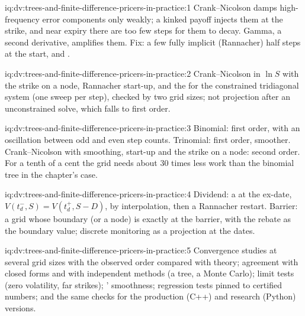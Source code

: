 \begin{solution}{iq:dv:trees-and-finite-difference-pricers-in-practice:1}
Crank--Nicolson damps high-frequency error components only weakly; a kinked payoff injects them at the strike, and near expiry there are too few
steps for them to decay. Gamma, a second derivative, amplifies them. Fix: a few fully implicit (Rannacher) half steps at the start, and .
\end{solution}

\begin{solution}{iq:dv:trees-and-finite-difference-pricers-in-practice:2}
Crank--Nicolson in $\ln S$ with the strike on a node, Rannacher start-up, and the  for the constrained tridiagonal system (one
sweep per step), checked by two grid sizes; not projection after an unconstrained solve, which falls to first order.
\end{solution}

\begin{solution}{iq:dv:trees-and-finite-difference-pricers-in-practice:3}
Binomial: first order, with an oscillation between odd and even step counts. Trinomial: first order, smoother. Crank--Nicolson with smoothing, start-up and
the strike on a node: second order. For a tenth of a cent the grid needs about 30 times less work than the binomial tree in the chapter's case.
\end{solution}

\begin{solution}{iq:dv:trees-and-finite-difference-pricers-in-practice:4}
Dividend: a  at the ex-date, $V(t_d^-,S)=V(t_d^+,S-D)$, by interpolation, then a Rannacher restart. Barrier: a grid whose boundary (or a node) is
exactly at the barrier, with the rebate as the boundary value; discrete monitoring as a projection at the dates.
\end{solution}

\begin{solution}{iq:dv:trees-and-finite-difference-pricers-in-practice:5}
Convergence studies at several grid sizes with the observed order compared with theory; agreement with closed forms and with independent methods (a tree, a
Monte Carlo); limit tests (zero volatility, far strikes); ' smoothness; regression tests pinned to certified numbers; and the same checks for the
production (C++) and research (Python) versions.
\end{solution}

